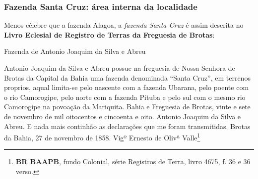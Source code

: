 
\subsubsection{Fazenda Santa Cruz: área interna da localidade}

Menos célebre que a fazenda Alagoa, a \textit{fazenda Santa Cruz} é assim descrita no \textbf{Livro Eclesial de Registro de Terras da Freguesia de Brotas}:

\begin{citacao}
Fazenda de Antonio Joaquim da Silva e Abreu

Antonio Joaquim da Silva e Abreu possue na freguesia de Nossa Senhora de Brotas da Capital da Bahia uma fazenda denominada ``Santa Cruz'', em terrenos proprios, aqual limita-se pelo nascente com a fazenda Ubarana, pelo poente com o rio Camorogipe, pelo norte com a fazenda Pituba e pelo sul com o mesmo rio Camorogipe na povoação da Mariquita. Bahia e Freguesia de Brotas, vinte e sete de novembro de mil oitocentos e cincoenta e oito. Antonio Joaquim da Silva e Abreu. E nada mais continhão as declarações que me foram transmitidas. Brotas da Bahia, 27 de novembro de 1858. Vigº Ernesto de Olivª Valle\footnote{\textbf{BR BAAPB}, fundo Colonial, série Registros de Terra, livro 4675, f. 36 e 36 verso.}
\end{citacao}

